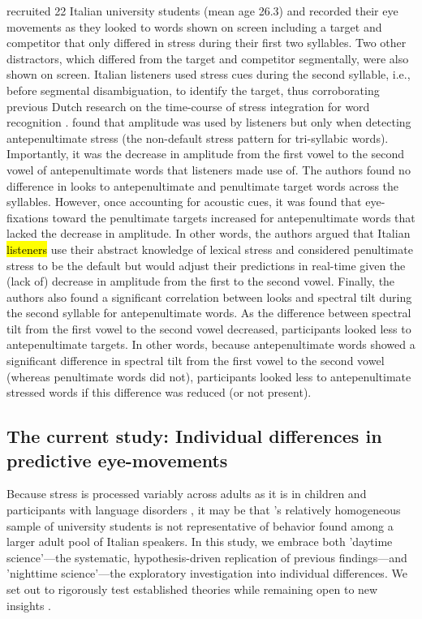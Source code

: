 \cite{Sulpizio_McQueen_2012} recruited 22 Italian university students (mean age 26.3) and recorded their eye movements as they looked to words shown on screen including a target and competitor that only differed in stress during their first two syllables. Two other distractors, which differed from the target and competitor segmentally, were also shown on screen. Italian listeners used stress cues during the second syllable, i.e., before segmental disambiguation, to identify the target, thus corroborating previous Dutch research on the time-course of stress integration for word recognition \citep{Reinisch2010}. \cite{Sulpizio_McQueen_2012} found that amplitude was used by listeners but only when detecting antepenultimate stress (the non-default stress pattern for tri-syllabic words). Importantly, it was the decrease in amplitude from the first vowel to the second vowel of antepenultimate words that listeners made use of. The authors found no difference in looks to antepenultimate and penultimate target words across the syllables. However, once accounting for acoustic cues, it was found that eye-fixations toward the penultimate targets increased for antepenultimate words that lacked the decrease in amplitude. In other words, the authors argued that Italian \hl{listeners} use their abstract knowledge of lexical stress and considered penultimate stress to be the default but would adjust their predictions in real-time given the (lack of) decrease in amplitude from the first to the second vowel. Finally, the authors also found a significant correlation between looks and spectral tilt during the second syllable for antepenultimate words. As the difference between spectral tilt from the first vowel to the second vowel decreased, participants looked less to antepenultimate targets. In other words, because antepenultimate words showed a significant difference in spectral tilt from the first vowel to the second vowel (whereas penultimate words did not), participants looked less to antepenultimate stressed words if this difference was reduced (or not present). 



\subsection{The current study: Individual differences in predictive eye-movements}
Because stress is processed variably across adults as it is in children \citep[e.g.,][]{Colombo2014} and participants with language disorders \citep[e.g.,][]{Cappa1997, Liu2018}, it may be that \cite{Sulpizio_McQueen_2012}'s relatively homogeneous sample of university students is not representative of behavior found among a larger adult pool of Italian speakers. In this study, we embrace both 'daytime science'—the systematic, hypothesis-driven replication of previous findings—and 'nighttime science'—the exploratory investigation into individual differences. We set out to rigorously test established theories while remaining open to new insights \citep{Yanai2020}.


